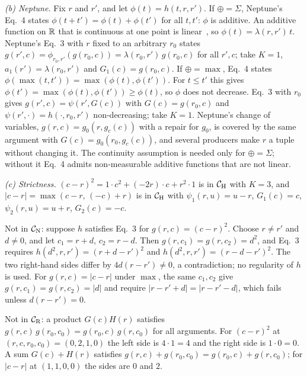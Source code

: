 \documentclass[acmsmall,screen,review,anonymous,nonacm]{acmart}
\begin{document}
\emph{(b) Neptune.}
Fix $r$ and $r'$, and let $\phi(t)=h(t,r,r')$.
If $\oplus=\Sigma$, Neptune's Eq.~4 states $\phi(t+t')=\phi(t)+\phi(t')$ for all $t,t'$: $\phi$ is additive.
An additive function on $\mathbb{R}$ that is continuous at one point is linear~\citep{kuczma}, so $\phi(t)=\lambda(r,r')\,t$.
Neptune's Eq.~3 with $r$ fixed to an arbitrary $r_0$ states $g(r',c)=\phi_{r_0,r'}(g(r_0,c))=\lambda(r_0,r')\,g(r_0,c)$ for all $r',c$; take $K=1$, $a_1(r')=\lambda(r_0,r')$ and $G_1(c)=g(r_0,c)$.
If $\oplus=\max$, Eq.~4 states $\phi(\max(t,t'))=\max(\phi(t),\phi(t'))$.
For $t\le t'$ this gives $\phi(t')=\max(\phi(t),\phi(t'))\ge\phi(t)$, so $\phi$ does not decrease.
Eq.~3 with $r_0$ gives $g(r',c)=\psi(r',G(c))$ with $G(c)=g(r_0,c)$ and $\psi(r',\cdot)=h(\cdot,r_0,r')$ non-decreasing; take $K=1$.
Neptune's change of variables, $g(r,c)=g_0(r,g_c(c))$ with a repair for $g_0$, is covered by the same argument with $G(c)=g_0(r_0,g_c(c))$, and several producers make $r$ a tuple without changing it.
The continuity assumption is needed only for $\oplus=\Sigma$; without it Eq.~4 admits non-measurable additive functions that are not linear.

\emph{(c) Strictness.}
$(c-r)^2=1\cdot c^2+(-2r)\cdot c+r^2\cdot1$ is in $\mathcal{C}_{\mathrm{H}}$ with $K=3$, and $|c-r|=\max(c-r,\,(-c)+r)$ is in $\mathcal{C}_{\mathrm{H}}$ with $\psi_1(r,u)=u-r$, $G_1(c)=c$, $\psi_2(r,u)=u+r$, $G_2(c)=-c$.

Not in $\mathcal{C}_{\mathrm{N}}$: suppose $h$ satisfies Eq.~3 for $g(r,c)=(c-r)^2$.
Choose $r\neq r'$ and $d\neq0$, and let $c_1=r+d$, $c_2=r-d$.
Then $g(r,c_1)=g(r,c_2)=d^2$, and Eq.~3 requires $h(d^2,r,r')=(r+d-r')^2$ and $h(d^2,r,r')=(r-d-r')^2$.
The two right-hand sides differ by $4d(r-r')\neq0$, a contradiction; no regularity of $h$ is used.
For $g(r,c)=|c-r|$ under $\max$, the same $c_1,c_2$ give $g(r,c_1)=g(r,c_2)=|d|$ and require $|r-r'+d|=|r-r'-d|$, which fails unless $d(r-r')=0$.

Not in $\mathcal{C}_{\mathrm{R}}$: a product $G(c)H(r)$ satisfies $g(r,c)\,g(r_0,c_0)=g(r_0,c)\,g(r,c_0)$ for all arguments.
For $(c-r)^2$ at $(r,c,r_0,c_0)=(0,2,1,0)$ the left side is $4\cdot1=4$ and the right side is $1\cdot0=0$.
A sum $G(c)+H(r)$ satisfies $g(r,c)+g(r_0,c_0)=g(r_0,c)+g(r,c_0)$; for $|c-r|$ at $(1,1,0,0)$ the sides are $0$ and $2$.
\end{document}
